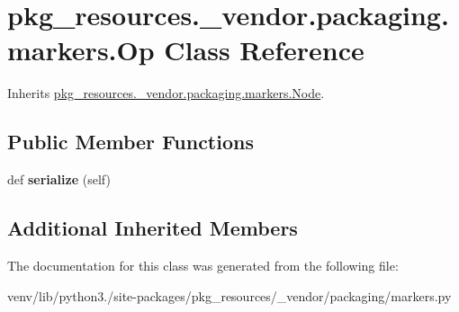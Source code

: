 \hypertarget{classpkg__resources_1_1__vendor_1_1packaging_1_1markers_1_1_op}{}\section{pkg\+\_\+resources.\+\_\+vendor.\+packaging.\+markers.\+Op Class Reference}
\label{classpkg__resources_1_1__vendor_1_1packaging_1_1markers_1_1_op}


Inherits \hyperlink{classpkg__resources_1_1__vendor_1_1packaging_1_1markers_1_1_node}{pkg\+\_\+resources.\+\_\+vendor.\+packaging.\+markers.\+Node}.

\subsection*{Public Member Functions}
\begin{DoxyCompactItemize}
\item 
\mbox{\label{classpkg__resources_1_1__vendor_1_1packaging_1_1markers_1_1_op_ae6e2b3e928ce015917574db2eef7061c}} 
def {\bfseries serialize} (self)
\end{DoxyCompactItemize}
\subsection*{Additional Inherited Members}


The documentation for this class was generated from the following file\+:\begin{DoxyCompactItemize}
\item 
venv/lib/python3./site-\/packages/pkg\+\_\+resources/\+\_\+vendor/packaging/markers.\+py\end{DoxyCompactItemize}
